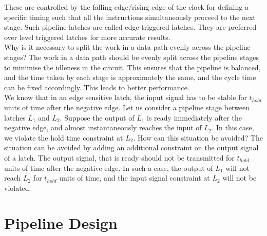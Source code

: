 \begin{ExerciseList}
These are controlled by the falling edge/rising edge of the clock for defining a specific timing such that all the instructions simultaneously proceed to the next stage. Such pipeline latches are called edge-triggered latches. They are preferred over level triggered latches for more accurate results. \\ 
\Exercise
Why is it necessary to split the work in a data path evenly across the pipeline stages?
\Answer
The work in a data path should be evenly split across the pipeline stages to minimise the idleness in the circuit. This ensures that the pipeline is balanced, and the time taken by each stage is approximately the same, and the cycle time can be fixed accordingly. This leads to better performance. \\
\Exercise[difficulty=1]
We know that in an edge sensitive latch, the input signal has to be stable for $t_{hold}$
units of
time after the negative edge. Let us consider a pipeline stage between latches
$L_1$ and $L_2$. Suppose the output of $L_1$ is ready immediately
after the negative edge, and almost
instantaneously reaches the input of $L_2$. In this case, 
we violate the hold time constraint at $L_2$. How can this situation be avoided?
\Answer
The situation can be avoided by adding an additional constraint on the output signal of a latch. The output signal, that is ready should not be transmitted for $t_{hold}$ units of time after the negative edge. In such a case, the output of $L_1$ will not reach $L_2$ for $t_{hold}$ units of time, and the input signal constraint at $L_2$ will not be violated. 
\end{ExerciseList}

\section*{Pipeline Design}

